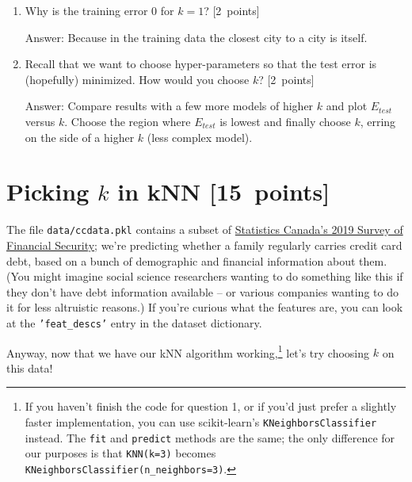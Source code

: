 \documentclass{article}
\newenvironment{answer}{\par\begingroup\color{gre}Answer: }{\endgroup}
\newcommand\pts[1]{\textcolor{pointscolour}{[#1~points]}}
\begin{document}
\begin{enumerate}
        \item Why is the training error $0$ for $k=1$? \pts{2}
        \begin{answer}
            Because in the training data the closest city to a city is itself.
        \end{answer}

        \item Recall that we want to choose hyper-parameters so that the test error is (hopefully) minimized. How would you choose $k$? \pts{2}
        \begin{answer}
            Compare results with a few more models of higher $k$ and plot $E_{test}$ versus $k$. Choose the region where $E_{test}$ is lowest and finally choose $k$, erring on the side of a higher $k$ (less complex model).
        \end{answer}
    \end{enumerate}

    \clearpage
    \section{Picking $k$ in kNN \pts{15}}
    The file \texttt{data/ccdata.pkl} contains a subset of \href{https://www23.statcan.gc.ca/imdb/p2SV.pl?Function=getSurvey&SDDS=2620}{Statistics Canada's 2019 Survey of Financial Security}; we're predicting whether a family regularly carries credit card debt, based on a bunch of demographic and financial information about them. (You might imagine social science researchers wanting to do something like this if they don't have debt information available -- or various companies wanting to do it for less altruistic reasons.) If you're curious what the features are, you can look at the \texttt{'feat\_descs'} entry in the dataset dictionary.

    Anyway, now that we have our kNN algorithm working,\footnote{If you haven't finish the code for question 1, or if you'd just prefer a slightly faster implementation, you can use scikit-learn's \texttt{KNeighborsClassifier} instead. The \texttt{fit} and \texttt{predict} methods are the same; the only difference for our purposes is that \texttt{KNN(k=3)} becomes \texttt{KNeighborsClassifier(n\_neighbors=3)}.} let's try choosing $k$ on this data!
\end{document}

